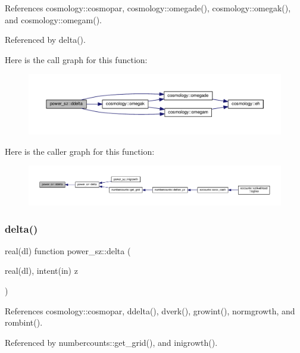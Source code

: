References cosmology\+::cosmopar, cosmology\+::omegade(), cosmology\+::omegak(), and cosmology\+::omegam().



Referenced by delta().

Here is the call graph for this function\+:
\nopagebreak
\begin{figure}[H]
\begin{center}
\leavevmode
\includegraphics[width=350pt]{namespacepower__sz_adf64f1eb16e70afa359a6b084d2219d4_cgraph}
\end{center}
\end{figure}
Here is the caller graph for this function\+:
\nopagebreak
\begin{figure}[H]
\begin{center}
\leavevmode
\includegraphics[width=350pt]{namespacepower__sz_adf64f1eb16e70afa359a6b084d2219d4_icgraph}
\end{center}
\end{figure}
\mbox{\label{namespacepower__sz_aa30236046bbf63ea0304f440bef4964d}} 
\subsubsection{\texorpdfstring{delta()}{delta()}}
{\footnotesize\ttfamily real(dl) function power\+\_\+sz\+::delta (\begin{DoxyParamCaption}\item[{real(dl), intent(in)}]{z }\end{DoxyParamCaption})}



References cosmology\+::cosmopar, ddelta(), dverk(), growint(), normgrowth, and rombint().



Referenced by numbercounts\+::get\+\_\+grid(), and inigrowth().

